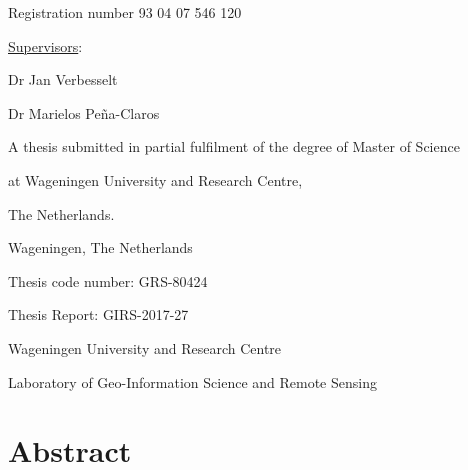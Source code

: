 \documentclass[a4paper,12pt]{scrbook}
\begin{document}
\begin{titlingpage}
  \begin{center}
  {\bfseries \Large \thetitle}\vspace{2.7cm}
  
  {\Large \theauthor}\vspace{1.1cm}
  
  {Registration number 93 04 07 546 120}\vspace{3.5cm}
  
  {\large \underline{Supervisors}:}\vspace{1.1cm}
  
  {Dr Jan Verbesselt}
  
  {Dr Marielos Peña-Claros}\vspace{3.0cm}
  
  {A thesis submitted in partial fulfilment of the degree of Master of Science}
  
  {at Wageningen University and Research Centre,}
  
  {The Netherlands.}\vspace{2.7cm}
  \end{center}
  
  \begin{flushright}
    {\thedate}
  
    {Wageningen, The Netherlands}
  \end{flushright}\vspace{0.5cm}

    Thesis code number: GRS-80424
  
    Thesis Report: GIRS-2017-27
  
    {Wageningen University and Research Centre}
  
    {Laboratory of Geo-Information Science and Remote Sensing}
 \end{titlingpage}

\chapter*{Abstract}
\end{document}
